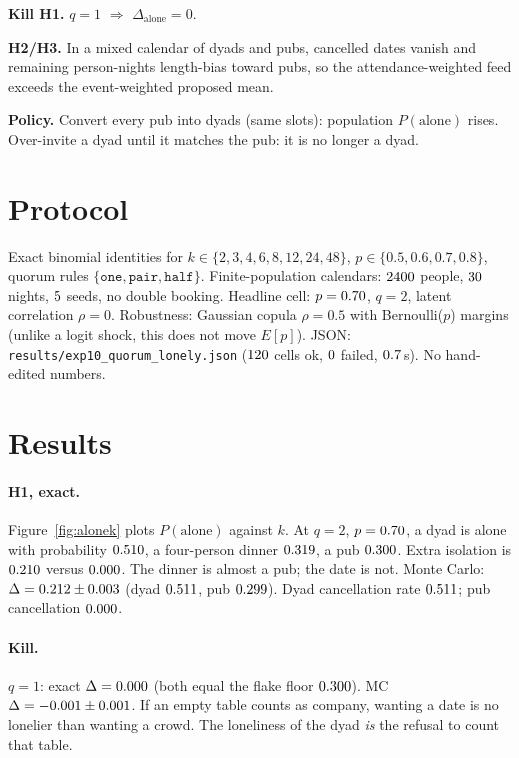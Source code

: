 \documentclass[10pt,twocolumn]{article}
\begin{document}
\textbf{Kill H1.} $q=1$ $\Rightarrow$ $\Delta_{\mathrm{alone}}=0$.

\textbf{H2/H3.} In a mixed calendar of dyads and pubs, cancelled dates
vanish and remaining person-nights length-bias toward pubs, so the
attendance-weighted feed exceeds the event-weighted proposed mean.

\textbf{Policy.} Convert every pub into dyads (same slots): population
$P(\mathrm{alone})$ rises. Over-invite a dyad until it matches the pub:
it is no longer a dyad.

\section{Protocol}

Exact binomial identities for $k\in\{2,3,4,6,8,12,24,48\}$,
$p\in\{0.5,0.6,0.7,0.8\}$, quorum rules $\{\texttt{one},\texttt{pair},\texttt{half}\}$.
Finite-population calendars: $2400$ people,
$30$ nights, $5$ seeds, no double booking.
Headline cell: $p=0.70$, $q=2$, latent correlation $\rho=0$.
Robustness: Gaussian copula $\rho=0.5$ with Bernoulli($p$) margins
(unlike a logit shock, this does not move $E[p]$).
JSON: \texttt{results/exp10\_quorum\_lonely.json}
($120$ cells ok, $0$ failed,
$0.7$\,s). No hand-edited numbers.

\section{Results}

\paragraph{H1, exact.}
Figure~\ref{fig:alonek} plots $P(\mathrm{alone})$ against $k$. At $q=2$,
$p=0.70$, a dyad is alone with probability $0.510$,
a four-person dinner $0.319$, a pub
$0.300$. Extra isolation is $0.210$ versus
$0.000$. The dinner is almost a pub; the date is not.
Monte Carlo: $\Delta=0.212\pm0.003$
(dyad $0.511$, pub $0.299$).
Dyad cancellation rate $0.511$; pub cancellation
$0.000$.

\paragraph{Kill.}
$q=1$: exact $\Delta=0.000$ (both equal the flake floor
$0.300$). MC $\Delta=-0.001\pm0.001$.
If an empty table counts as company, wanting a date is no lonelier than
wanting a crowd. The loneliness of the dyad \emph{is} the refusal to count
that table.
\end{document}

